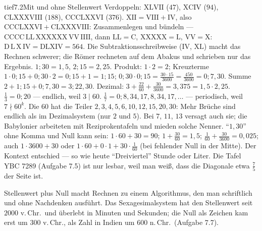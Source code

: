 \begin{loesungkarte}{tief}{7.2}{Mit und ohne Stellenwert}
Verdoppeln: $\mathrm{XLVII}$ ($47$), $\mathrm{XCIV}$ ($94$), $\mathrm{CLXXXVIII}$ ($188$), $\mathrm{CCCLXXVI}$ ($376$). $\mathrm{XII} = \mathrm{VIII} + \mathrm{IV}$, also $\mathrm{CCCLXXVI} + \mathrm{CLXXXVIII}$: Zusammenlegen und bündeln --- $\mathrm{CCCC}\,\mathrm{LL}\,\mathrm{XXXXXX}\,\mathrm{VV}\,\mathrm{IIII}$, dann $\mathrm{LL} = \mathrm{C}$, $\mathrm{XXXXX} = \mathrm{L}$, $\mathrm{VV} = \mathrm{X}$: $\mathrm{D}\,\mathrm{L}\,\mathrm{X}\,\mathrm{IV} = \mathrm{DLXIV} = 564$. Die Subtraktionsschreibweise ($\mathrm{IV}$, $\mathrm{XL}$) macht das Rechnen schwerer; die Römer rechneten auf dem Abakus und schrieben nur das Ergebnis.
$1;30 = 1{,}5$, $2;15 = 2{,}25$. Produkt: $1\cdot2 = 2$; Kreuzterme $1\cdot0;15 + 0;30\cdot2 = 0;15 + 1 = 1;15$; $0;30\cdot0;15 = \frac{30\cdot15}{3600} = \frac{450}{3600} = 0;7,30$. Summe $2 + 1;15 + 0;7,30 = 3;22,30$. Dezimal: $3 + \frac{22}{60} + \frac{30}{3600} = 3{,}375 = 1{,}5\cdot2{,}25$. \checkmark
{}
$\frac13 = 0;20$ --- endlich, weil $3\mid60$. $\frac17 = 0;8,34,17,8,34,17,\dots$ --- periodisch, weil $7\nmid60^{k}$. Die $60$ hat die Teiler $2, 3, 4, 5, 6, 10, 12, 15, 20, 30$: Mehr Brüche sind endlich als im Dezimalsystem (nur $2$ und $5$). Bei $7$, $11$, $13$ versagt auch sie; die Babylonier arbeiteten mit Reziprokentafeln und mieden solche Nenner.
\enquote{$1, 30$} ohne Komma und Null kann sein: $1\cdot60 + 30 = 90$; $1 + \frac{30}{60} = 1{,}5$; $\frac1{60} + \frac{30}{3600} = 0{,}025$; auch $1\cdot3600 + 30$ oder $1\cdot60 + 0\cdot1 + 30\cdot\frac1{60}$ (bei fehlender Null in der Mitte). Der Kontext entschied --- so wie heute \enquote{Dreiviertel} Stunde oder Liter. Die Tafel YBC 7289 (Aufgabe 7.5) ist nur lesbar, weil man weiß, dass die Diagonale etwa $\frac75$ der Seite ist.
\begin{mitnehmen}\kastentext
Stellenwert plus Null macht Rechnen zu einem Algorithmus, den man schriftlich und ohne Nachdenken ausführt. Das Sexagesimalsystem hat den Stellenwert seit $2000$ v.\,Chr.\ und überlebt in Minuten und Sekunden; die Null als Zeichen kam erst um $300$ v.\,Chr., als Zahl in Indien um $600$ n.\,Chr.\ (Aufgabe 7.7).
\end{mitnehmen}
\end{loesungkarte}

